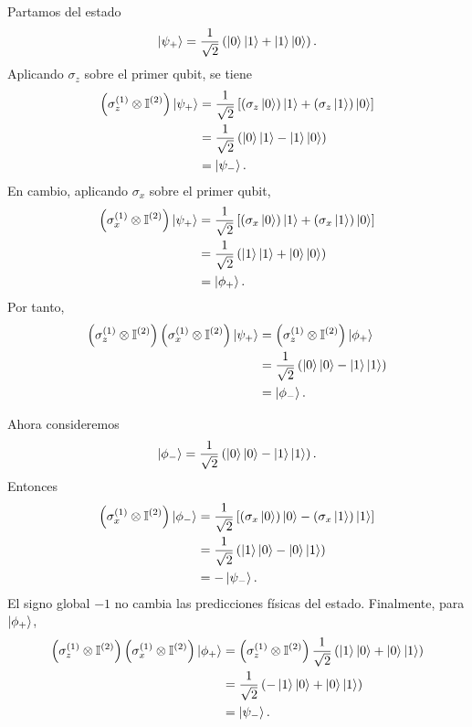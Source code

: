 \documentclass[../main.tex]{subfiles}
\begin{document}
Partamos del estado
\begin{equation*}
    \ket{\psi_+}=\frac{1}{\sqrt{2}}\left(\ket{0}\ket{1}+\ket{1}\ket{0}\right).
\end{equation*}
Aplicando $\sigma_z$ sobre el primer qubit, se tiene
\begin{align*}
    \left(\sigma_z^{(1)}\otimes\mathbb{I}^{(2)}\right)\ket{\psi_+}
    &=\frac{1}{\sqrt{2}}\left[
    \left(\sigma_z\ket{0}\right)\ket{1}
    +\left(\sigma_z\ket{1}\right)\ket{0}
    \right]\\
    &=\frac{1}{\sqrt{2}}\left(\ket{0}\ket{1}-\ket{1}\ket{0}\right)\\
    &=\ket{\psi_-}.
\end{align*}
En cambio, aplicando $\sigma_x$ sobre el primer qubit,
\begin{align*}
    \left(\sigma_x^{(1)}\otimes\mathbb{I}^{(2)}\right)\ket{\psi_+}
    &=\frac{1}{\sqrt{2}}\left[
    \left(\sigma_x\ket{0}\right)\ket{1}
    +\left(\sigma_x\ket{1}\right)\ket{0}
    \right]\\
    &=\frac{1}{\sqrt{2}}\left(\ket{1}\ket{1}+\ket{0}\ket{0}\right)\\
    &=\ket{\phi_+}.
\end{align*}
Por tanto,
\begin{align*}
    \left(\sigma_z^{(1)}\otimes\mathbb{I}^{(2)}\right)
    \left(\sigma_x^{(1)}\otimes\mathbb{I}^{(2)}\right)
    \ket{\psi_+}
    &=\left(\sigma_z^{(1)}\otimes\mathbb{I}^{(2)}\right)\ket{\phi_+}\\
    &=\frac{1}{\sqrt{2}}\left(\ket{0}\ket{0}-\ket{1}\ket{1}\right)\\
    &=\ket{\phi_-}.
\end{align*}

Ahora consideremos
\begin{equation*}
    \ket{\phi_-}=\frac{1}{\sqrt{2}}\left(\ket{0}\ket{0}-\ket{1}\ket{1}\right).
\end{equation*}
Entonces
\begin{align*}
    \left(\sigma_x^{(1)}\otimes\mathbb{I}^{(2)}\right)\ket{\phi_-}
    &=\frac{1}{\sqrt{2}}\left[
    \left(\sigma_x\ket{0}\right)\ket{0}
    -\left(\sigma_x\ket{1}\right)\ket{1}
    \right]\\
    &=\frac{1}{\sqrt{2}}\left(\ket{1}\ket{0}-\ket{0}\ket{1}\right)\\
    &=-\ket{\psi_-}.
\end{align*}
El signo global $-1$ no cambia las predicciones físicas del estado. Finalmente, para $\ket{\phi_+}$,
\begin{align*}
    \left(\sigma_z^{(1)}\otimes\mathbb{I}^{(2)}\right)
    \left(\sigma_x^{(1)}\otimes\mathbb{I}^{(2)}\right)\ket{\phi_+}
    &=\left(\sigma_z^{(1)}\otimes\mathbb{I}^{(2)}\right)
    \frac{1}{\sqrt{2}}\left(\ket{1}\ket{0}+\ket{0}\ket{1}\right)\\
    &=\frac{1}{\sqrt{2}}\left(-\ket{1}\ket{0}+\ket{0}\ket{1}\right)\\
    &=\ket{\psi_-}.
\end{align*}
\end{document}
